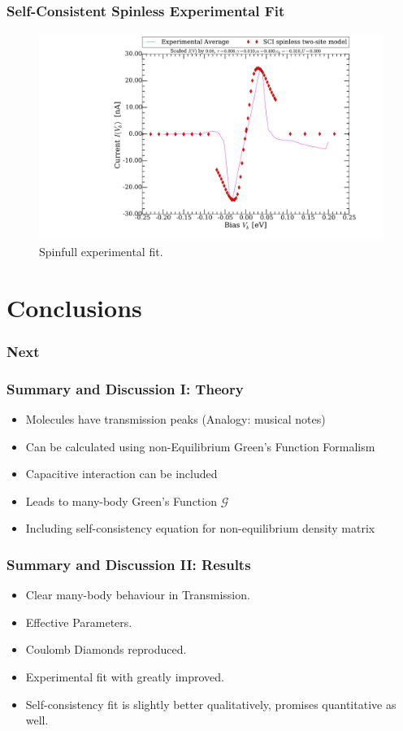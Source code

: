 \begin{frame}
    \frametitle{Self-Consistent Spinless Experimental Fit}
    \vspace{-3mm}
    \begin{figure}[!b] 
        \centering
        \includegraphics[height=.75\textheight, width=\textwidth, clip=true, trim=6cm 0cm 0cm 0cm]{res/selfconsistent.pdf}
        \vspace{-6mm}
        \caption{Spinfull experimental fit.}
    \end{figure} 
\end{frame}
\section{Conclusions}
\begin{frame}
    \frametitle{Next}
\end{frame} 
\begin{frame}
    \frametitle{Summary and Discussion I: Theory}
    \begin{itemize}
        \item Molecules have transmission peaks (Analogy: musical notes)
        \item Can be calculated using non-Equilibrium Green's Function Formalism
        \item Capacitive interaction can be included
        \item Leads to many-body Green's Function $\mathscr{G}$
        \item Including self-consistency equation for non-equilibrium density matrix 
    \end{itemize} 
\end{frame} 
\begin{frame}
    \frametitle{Summary and Discussion II: Results}
    \begin{itemize} 
        \item Clear many-body behaviour in Transmission.
        \item Effective Parameters.
        \item Coulomb Diamonds reproduced.
        \item Experimental fit with \citet{perrin} greatly improved.
        \item Self-consistency fit is slightly better qualitatively, promises quantitative as well.
    \end{itemize}
\end{frame} 
